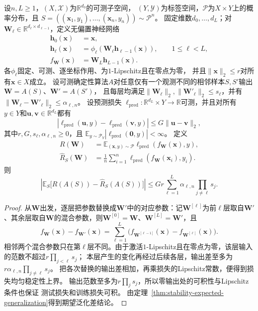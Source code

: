 \begin{theorem}[分层参数稳定性与期望泛化差]
\label{thm:layerwise-parameter-stability}
设$n,L\geq1$，$(X,\mathcal X)$为$\mathbb R^{d_0}$的可测子空间，
$(Y,\mathcal Y)$为标签空间，$\mathcal P$为$X\times Y$上的概率分布，且
$S=((\bm x_1,y_1),\ldots,(\bm x_n,y_n))\sim\mathcal P^n$。
固定维数$d_0,\ldots,d_L$；对
$\bm W_\ell\in\mathbb R^{d_\ell\times d_{\ell-1}}$，定义无偏置神经网络
\[
\begin{aligned}
 \bm h_0(\bm x)&=\bm x,\\
 \bm h_\ell(\bm x)
 &=\phi_\ell(\bm W_\ell\bm h_{\ell-1}(\bm x)),
 \qquad 1\leq\ell<L,\\
 f_{\bm W}(\bm x)&=\bm W_L\bm h_{L-1}(\bm x).
\end{aligned}
\]
各$\phi_\ell$固定、可测、逐坐标作用、为$1$-Lipschitz且在零点为零，
并且$\|\bm x\|_2\leq r$对所有$\bm x\in X$成立。
设可测确定性算法$A$对任意仅有一个观测不同的相邻样本$S,S'$输出
$\bm W=A(S)$、$\bm W'=A(S')$，
且每层均满足$\|\bm W_\ell\|_2,\|\bm W'_\ell\|_2\leq s_\ell$，并有
$\|\bm W_\ell-\bm W'_\ell\|_2\leq\alpha_{\ell,n}$。
设预测损失
$\ell_{\mathrm{pred}}:\mathbb R^{d_L}\times Y\to\mathbb R$可测，并且对所有
$y\in Y$和$\bm u,\bm v\in\mathbb R^{d_L}$都有
\[
 |\ell_{\mathrm{pred}}(\bm u,y)-\ell_{\mathrm{pred}}(\bm v,y)|
 \leq G\|\bm u-\bm v\|_2,
\]
其中$r,G,s_\ell,\alpha_{\ell,n}\geq0$，且
$\mathbb E_{y\sim\mathcal P_Y}|\ell_{\mathrm{pred}}(\bm 0,y)|<\infty$。
定义
\[
\begin{aligned}
 R(\bm W)
 &=\mathbb E_{(\bm x,y)\sim\mathcal P}
   \ell_{\mathrm{pred}}(f_{\bm W}(\bm x),y),\\
 \hat R_S(\bm W)
 &=\frac1n\sum_{i=1}^n
   \ell_{\mathrm{pred}}(f_{\bm W}(\bm x_i),y_i).
\end{aligned}
\]
则
\[
 \left|\mathbb E_S\bigl[R(A(S))-\hat R_S(A(S))\bigr]\right|
 \leq Gr\sum_{\ell=1}^L\alpha_{\ell,n}\prod_{j\ne\ell}s_j.
\]
\end{theorem}
\begin{proof}
从$\bm W$出发，逐层把参数替换成$\bm W'$中的对应参数：记$\bm W^{[\ell]}$为前$\ell$层取自$\bm W'$、其余层取自$\bm W$的混合参数，则$\bm W^{[0]}=\bm W$、$\bm W^{[L]}=\bm W'$，且
\[
 f_{\bm W}(\bm x)-f_{\bm W'}(\bm x)
 =\sum_{\ell=1}^L\bigl(f_{\bm W^{[\ell-1]}}(\bm x)-f_{\bm W^{[\ell]}}(\bm x)\bigr).
\]
相邻两个混合参数只在第$\ell$层不同。由于激活$1$-Lipschitz且在零点为零，该层输入的范数不超过$r\prod_{j<\ell}s_j$；
本层产生的变化再经过后续各层，输出差至多为
$r\alpha_{\ell,n}\prod_{j\ne\ell}s_j$。
把各次替换的输出差相加，再乘损失的Lipschitz常数，便得到损失均匀稳定性上界。
输出范数至多为$r\prod_j s_j$，所以零输出处的可积性与Lipschitz条件也保证
测试损失和训练损失可积。
由定理~\ref{thm:stability-expected-generalization}得到期望泛化差结论。
\end{proof}

